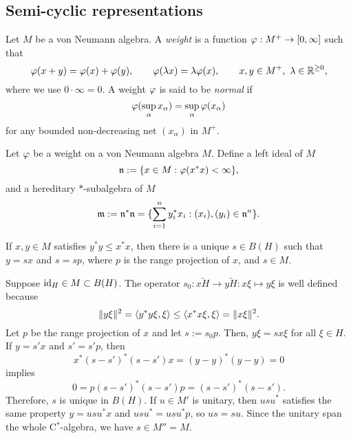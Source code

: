 \documentclass{../../small}
\begin{document}
\subsection{Semi-cyclic representations}


\begin{defn}[Weights]
Let $M$ be a von Neumann algebra.
A \emph{weight} is a function $\varphi:M^+\to[0,\infty]$ such that
\[\varphi(x+y)=\varphi(x)+\varphi(y),\qquad\varphi(\lambda x)=\lambda\varphi(x),\qquad x,y\in M^+,\ \lambda\in\mathbb{R}^{\ge0},\]
where we use $0\cdot\infty=0$.
A weight $\varphi$ is said to be \emph{normal} if
\[\varphi(\sup_\alpha x_\alpha)=\sup_\alpha\varphi(x_\alpha)\]
for any bounded non-decreasing net $(x_\alpha)$ in $M^+$.
\end{defn}
\begin{defn}
Let $\varphi$ be a weight on a von Neumann algebra $M$.
Define a left ideal of $M$
\[\mathfrak{n}:=\{x\in M:\varphi(x^*x)<\infty\},\]
and a hereditary $*$-subalgebra of $M$
\[\mathfrak{m}:=\mathfrak{n}^*\mathfrak{n}=\{\sum_{i=1}^ny_i^*x_i:(x_i),(y_i)\in\mathfrak{n}^n\}.\]
\end{defn}


\begin{lem}
If $x,y\in M$ satisfies $y^*y\le x^*x$, then there is a unique $s\in B(H)$ such that $y=sx$ and $s=sp$, where $p$ is the range projection of $x$, and $s\in M$.
\end{lem}
\begin{pf}
Suppose $\operatorname{id}_H\in M\subset B(H)$.
The operator $s_0:\bar{xH}\to\bar{yH}:x\xi\mapsto y\xi$ is well defined because
\[\|y\xi\|^2=\langle y^*y\xi,\xi\rangle\le\langle x^*x\xi,\xi\rangle=\|x\xi\|^2.\]
Let $p$ be the range projection of $x$ and let $s:=s_0p$.
Then, $y\xi=sx\xi$ for all $\xi\in H$.
If $y=s'x$ and $s'=s'p$, then
\[x^*(s-s')^*(s-s')x=(y-y)^*(y-y)=0\]
implies
\[0=p(s-s')^*(s-s')p=(s-s')^*(s-s').\]
Therefore, $s$ is unique in $B(H)$.
If $u\in M'$ is unitary, then $usu^*$ satisfies the same property $y=usu^*x$ and $usu^*=usu^*p$, so $us=su$.
Since the unitary span the whole C$^*$-algebra, we have $s\in M''=M$.
\end{pf}
\end{document}
